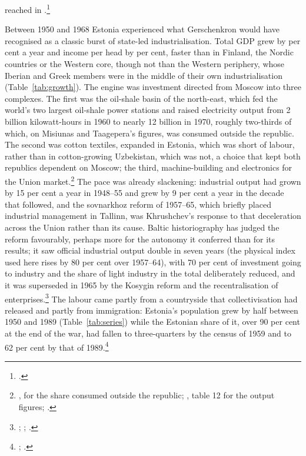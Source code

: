reached in .\footnote{\autocite[234]{years_of_dependence}.}

Between 1950 and 1968 Estonia experienced what Gerschenkron would have recognised as a classic burst of state-led industrialisation. Total GDP grew by  per cent a year and income per head by  per cent, faster than in Finland, the Nordic countries or the Western core, though not than the Western periphery, whose Iberian and Greek members were in the middle of their own industrialisation (Table~\ref{tab:growth}). The engine was investment directed from Moscow into three complexes. The first was the oil-shale basin of the north-east, which fed the world's two largest oil-shale power stations and raised electricity output from 2 billion kilowatt-hours in 1960 to nearly 12 billion in 1970, roughly two-thirds of which, on Misiunas and Taagepera's figures, was consumed outside the republic. The second was cotton textiles, expanded in Estonia, which was short of labour, rather than in cotton-growing Uzbekistan, which was not, a choice that kept both republics dependent on Moscow; the third, machine-building and electronics for the Union market.\footnote{\autocite[239]{years_of_dependence}, for the share consumed outside the republic; \autocite[41--7]{ahderajasalu1992}, table 12 for the output figures; \autocite[248--58]{pihlamagi2013}.} The pace was already slackening: industrial output had grown by 15 per cent a year in 1948--55 and grew by 9 per cent a year in the decade that followed, and the sovnarkhoz reform of 1957--65, which briefly placed industrial management in Tallinn, was Khrushchev's response to that deceleration across the Union rather than its cause. Baltic historiography has judged the reform favourably, perhaps more for the autonomy it conferred than for its results; it saw official industrial output double in seven years (the physical index used here rises by 80 per cent over 1957--64), with 70 per cent of investment going to industry and the share of light industry in the total deliberately reduced, and it was superseded in 1965 by the Kosygin reform and the recentralisation of enterprises.\footnote{\autocite[248--52]{pihlamagi2013}; \autocite[67--70]{purre1965}; \autocite[188]{years_of_dependence}.} The labour came partly from a countryside that collectivisation had released and partly from immigration: Estonia's population grew by half between 1950 and 1989 (Table~\ref{tab:series}) while the Estonian share of it, over 90 per cent at the end of the war, had fallen to three-quarters by the census of 1959 and to 62 per cent by that of 1989.\footnote{\autocite[35--41, 111]{case_estonia}; \autocite[154]{kasekamp2010}.}

